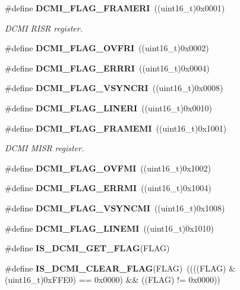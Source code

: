 \begin{DoxyCompactItemize}
\#define \textbf{ D\+C\+M\+I\+\_\+\+F\+L\+A\+G\+\_\+\+F\+R\+A\+M\+E\+RI}~((uint16\+\_\+t)0x0001)
\begin{DoxyCompactList}\small\item\em D\+C\+MI R\+I\+SR register. \end{DoxyCompactList}\item 
\#define \textbf{ D\+C\+M\+I\+\_\+\+F\+L\+A\+G\+\_\+\+O\+V\+F\+RI}~((uint16\+\_\+t)0x0002)
\item 
\#define \textbf{ D\+C\+M\+I\+\_\+\+F\+L\+A\+G\+\_\+\+E\+R\+R\+RI}~((uint16\+\_\+t)0x0004)
\item 
\#define \textbf{ D\+C\+M\+I\+\_\+\+F\+L\+A\+G\+\_\+\+V\+S\+Y\+N\+C\+RI}~((uint16\+\_\+t)0x0008)
\item 
\#define \textbf{ D\+C\+M\+I\+\_\+\+F\+L\+A\+G\+\_\+\+L\+I\+N\+E\+RI}~((uint16\+\_\+t)0x0010)
\item 
\#define \textbf{ D\+C\+M\+I\+\_\+\+F\+L\+A\+G\+\_\+\+F\+R\+A\+M\+E\+MI}~((uint16\+\_\+t)0x1001)
\begin{DoxyCompactList}\small\item\em D\+C\+MI M\+I\+SR register. \end{DoxyCompactList}\item 
\#define \textbf{ D\+C\+M\+I\+\_\+\+F\+L\+A\+G\+\_\+\+O\+V\+F\+MI}~((uint16\+\_\+t)0x1002)
\item 
\#define \textbf{ D\+C\+M\+I\+\_\+\+F\+L\+A\+G\+\_\+\+E\+R\+R\+MI}~((uint16\+\_\+t)0x1004)
\item 
\#define \textbf{ D\+C\+M\+I\+\_\+\+F\+L\+A\+G\+\_\+\+V\+S\+Y\+N\+C\+MI}~((uint16\+\_\+t)0x1008)
\item 
\#define \textbf{ D\+C\+M\+I\+\_\+\+F\+L\+A\+G\+\_\+\+L\+I\+N\+E\+MI}~((uint16\+\_\+t)0x1010)
\item 
\#define \textbf{ I\+S\+\_\+\+D\+C\+M\+I\+\_\+\+G\+E\+T\+\_\+\+F\+L\+AG}(F\+L\+AG)
\item 
\#define \textbf{ I\+S\+\_\+\+D\+C\+M\+I\+\_\+\+C\+L\+E\+A\+R\+\_\+\+F\+L\+AG}(F\+L\+AG)~((((F\+L\+AG) \& (uint16\+\_\+t)0x\+F\+F\+E0) == 0x0000) \&\& ((\+F\+L\+A\+G) != 0x0000))
\end{DoxyCompactItemize}
